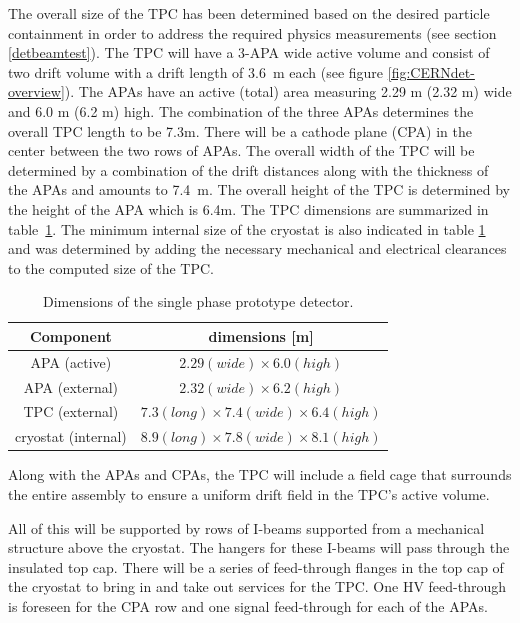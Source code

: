 The overall size of the TPC has been determined based on the desired particle containment in order to address the required physics measurements (see section \ref{detbeamtest}). The TPC will have a 3-APA wide active volume and consist of two drift volume with a drift length of 3.6~m each (see figure \ref{fig:CERNdet-overview}).  
The APAs have an active (total) area measuring 2.29 m (2.32 m) wide and 6.0 m (6.2 m) high. The combination of the three APAs determines the overall TPC length to be 7.3m. There will be a cathode plane (CPA) in the center between the two rows of APAs.  
The overall width of the TPC will be determined by a combination of the drift distances along with the thickness of the APAs
and amounts to 7.4~m.  
The overall height of the TPC is determined by the height of the APA which is 6.4m.  The TPC dimensions are summarized in 
table~\ref{table:TPC-dim}.
%
The minimum internal size of the cryostat is also indicated in table \ref{table:TPC-dim} and was determined by adding the necessary mechanical and electrical clearances to the computed size of the TPC.  
 
\begin{table}[h]
\centering
\begin{tabular}{|c|c|}
\hline
\textbf{ Component } & dimensions [m]  \\ \hline \hline
APA  (active) &  $2.29 (wide) \times 6.0 (high)$ \\ \hline
APA  (external) &  $2.32 (wide) \times 6.2 (high)$ \\ \hline
TPC (external)       & $7.3 (long) \times 7.4 (wide) \times 6.4 (high)$  \\ \hline
cryostat (internal) &  $8.9 (long) \times 7.8 (wide) \times 8.1 (high)$  \\ \hline
\end{tabular}
\caption{Dimensions of the single phase prototype detector.}
\label{table:TPC-dim}
\end{table}
 
Along with the APAs and CPAs, the TPC will include a field cage that surrounds the entire assembly to ensure a uniform drift field in the TPC's active volume. 


All of this will be supported by rows of I-beams supported from a mechanical structure above the cryostat.  The hangers for these I-beams will pass through the insulated top cap.  There will be a series of feed-through flanges in the top cap of the cryostat to bring in and take out services for the TPC.  One HV feed-through is foreseen for the CPA row and one signal feed-through for each of the APAs.

